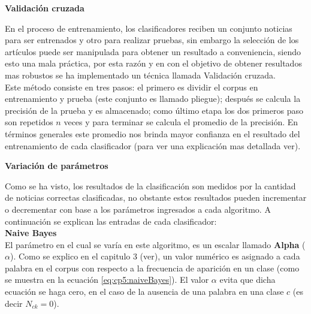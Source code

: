 
\begin{large}
\textbf{Validación cruzada}\\
\end{large}

En el proceso de entrenamiento, los clasificadores reciben un conjunto noticias para ser entrenados y otro para realizar pruebas, sin embargo la selección de los artículos puede ser manipulada para obtener un resultado a conveniencia, siendo esto una mala práctica, por esta razón y en con el objetivo de obtener resultados mas robustos se ha implementado un técnica llamada Validación cruzada.\\

Este método consiste en tres pasos: el primero es dividir el corpus en entrenamiento y prueba (este conjunto es llamado pliegue); después se calcula la precisión de la prueba y es almacenado; como último etapa los dos primeros paso son repetidos $n$ veces y para terminar  se calcula el promedio de la precisión. En términos generales este promedio nos brinda mayor confianza en el resultado del entrenamiento de cada clasificador (para ver una explicación mas detallada ver).\\


\begin{large}
\textbf{Variación de parámetros}\\
\end{large}

Como se ha visto, los resultados de la clasificación son medidos por la cantidad de noticias correctas clasificadas, no obstante estos resultados pueden incrementar o decrementar con base a los parámetros ingresados a cada algoritmo. A continuación se explican las entradas de cada clasificador: \\

\textbf{Naive Bayes}\\
 
El parámetro en el cual se varía en este algoritmo, es un escalar llamado \textbf{Alpha} ($\alpha$). Como se explico en el capitulo 3 (ver), un valor numérico es asignado a cada palabra en el corpus con respecto a la frecuencia de aparición en un clase (como se muestra en la ecuación \ref{eq:cp5:naiveBayes}). El valor $\alpha$ evita que dicha ecuación se haga cero, en el caso de la ausencia de una palabra en una clase $c$ (es decir $N_{ck}=0$).



